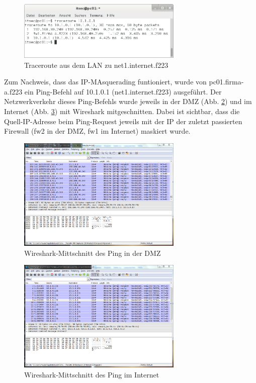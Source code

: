\begin{figure}[h!]
	\centering
		\includegraphics[width=0.7\textwidth]{figures/pc01_traceroute_net1.png}
	\caption{Traceroute aus dem LAN zu net1.internet.f223}
	\label{fig:pc01_traceroute_net1}
\end{figure}

Zum Nachweis, dass das IP-MAsquerading funtioniert, wurde von pc01.firma-a.f223 ein Ping-Befehl auf 10.1.0.1 (net1.internet.f223) ausgeführt. Der Netzwerkverkehr dieses Ping-Befehls wurde jeweils in der DMZ (Abb. \ref{fig:ws_dmz}) und im Internet (Abb. \ref{fig:ws_internet}) mit Wireshark mitgeschnitten. Dabei ist sichtbar, dass die Quell-IP-Adresse beim Ping-Request jeweils mit der IP der zuletzt passierten Firewall (fw2 in der DMZ, fw1 im Internet) maskiert wurde.

\begin{figure}[h!]
	\centering
		\includegraphics[width=0.7\textwidth]{figures/ws_dmz.png}
	\caption{Wireshark-Mittschnitt des Ping in der DMZ}
	\label{fig:ws_dmz}
\end{figure}

\begin{figure}[h!]
	\centering
		\includegraphics[width=0.7\textwidth]{figures/ws_internet.png}
	\caption{Wireshark-Mittschnitt des Ping im Internet}
	\label{fig:ws_internet}
\end{figure}

